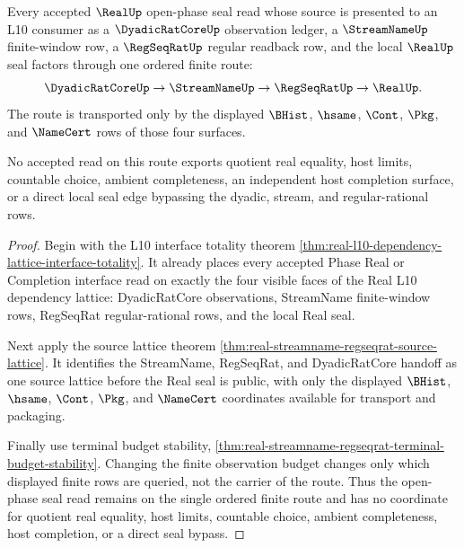 \begin{theorem}
\label{thm:real-dyadic-stream-regseq-route}
Every accepted $\RealUp$ open-phase seal read whose source is presented to an
L10 consumer as a $\DyadicRatCoreUp$ observation ledger, a $\StreamNameUp$
finite-window row, a $\RegSeqRatUp$ regular readback row, and the local
$\RealUp$ seal factors through one ordered finite route:
$$
\DyadicRatCoreUp \to \StreamNameUp \to \RegSeqRatUp \to \RealUp .
$$
The route is transported only by the displayed $\BHist$, $\hsame$, $\Cont$,
$\Pkg$, and $\NameCert$ rows of those four surfaces.

No accepted read on this route exports quotient real equality, host limits,
countable choice, ambient completeness, an independent host completion
surface, or a direct local seal edge bypassing the dyadic, stream, and
regular-rational rows.
\end{theorem}
\begin{proof}
Begin with the L10 interface totality theorem
\autoref{thm:real-l10-dependency-lattice-interface-totality}. It already
places every accepted Phase Real or Completion interface read on exactly the
four visible faces of the Real L10 dependency lattice: DyadicRatCore
observations, StreamName finite-window rows, RegSeqRat regular-rational rows,
and the local Real seal.

Next apply the source lattice theorem
\autoref{thm:real-streamname-regseqrat-source-lattice}. It identifies the
StreamName, RegSeqRat, and DyadicRatCore handoff as one source lattice before
the Real seal is public, with only the displayed $\BHist$, $\hsame$, $\Cont$,
$\Pkg$, and $\NameCert$ coordinates available for transport and packaging.

Finally use terminal budget stability,
\autoref{thm:real-streamname-regseqrat-terminal-budget-stability}. Changing
the finite observation budget changes only which displayed finite rows are
queried, not the carrier of the route. Thus the open-phase seal read remains
on the single ordered finite route and has no coordinate for quotient real
equality, host limits, countable choice, ambient completeness, host
completion, or a direct seal bypass.
\end{proof}

